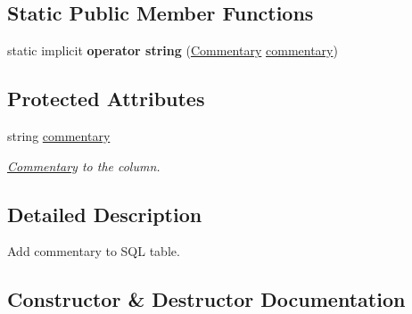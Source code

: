 \subsection*{Static Public Member Functions}
\begin{DoxyCompactItemize}
\item 
\mbox{\label{class_uniform_data_operator_1_1_sql_1_1_tables_1_1_attributes_1_1_commentary_a2885c7728a4efd579cae430322413089}} 
static implicit {\bfseries operator string} (\mbox{\hyperlink{class_uniform_data_operator_1_1_sql_1_1_tables_1_1_attributes_1_1_commentary}{Commentary}} \mbox{\hyperlink{class_uniform_data_operator_1_1_sql_1_1_tables_1_1_attributes_1_1_commentary_ae5b1dba615a813beddea425d35297e54}{commentary}})
\end{DoxyCompactItemize}
\subsection*{Protected Attributes}
\begin{DoxyCompactItemize}
\item 
string \mbox{\hyperlink{class_uniform_data_operator_1_1_sql_1_1_tables_1_1_attributes_1_1_commentary_ae5b1dba615a813beddea425d35297e54}{commentary}}
\begin{DoxyCompactList}\small\item\em \mbox{\hyperlink{class_uniform_data_operator_1_1_sql_1_1_tables_1_1_attributes_1_1_commentary}{Commentary}} to the column. \end{DoxyCompactList}\end{DoxyCompactItemize}


\subsection{Detailed Description}
Add commentary to S\+QL table. 



\subsection{Constructor \& Destructor Documentation}
\mbox{\label{class_uniform_data_operator_1_1_sql_1_1_tables_1_1_attributes_1_1_commentary_a783f8260ef410428b29e9c3b9e5f22b4}} 

